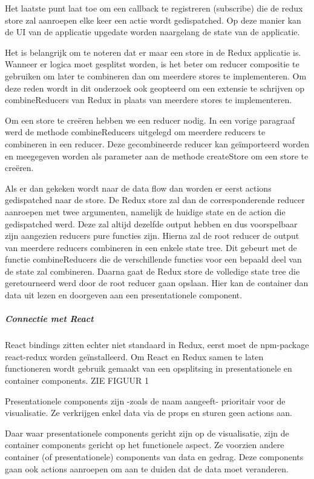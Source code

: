 Het laatste punt laat toe om een callback te registreren (subscribe) die de redux store zal aanroepen elke keer een actie wordt gedispatched. Op deze manier kan de UI van de applicatie upgedate worden naargelang de state van de applicatie. 

Het is belangrijk om te noteren dat er maar een store in de Redux applicatie is. Wanneer er logica moet gesplitst worden, is het beter om reducer compositie te gebruiken om later te combineren dan om meerdere stores te implementeren. Om deze reden wordt in dit onderzoek ook geopteerd om een extensie te schrijven op combineReducers van Redux in plaats van meerdere stores te implementeren.

Om een store te creëren hebben we een reducer nodig. In een vorige paragraaf werd de methode combineReducers uitgelegd om meerdere reducers te combineren in een reducer. Deze gecombineerde reducer kan geïmporteerd worden en meegegeven worden als parameter aan de methode createStore om een store te creëren.

Als er dan gekeken wordt naar de data flow dan worden er eerst actions gedispatched naar de store. De Redux store zal dan de corresponderende reducer aanroepen met twee argumenten, namelijk de huidige state en de action die gedispatched werd. Deze zal altijd dezelfde output hebben en dus voorspelbaar zijn aangezien reducers pure functies zijn.	 Hierna zal de root reducer de output van meerdere reducers combineren in een enkele state tree. Dit gebeurt met de functie combineReducers die de verschillende functies voor een bepaald deel van de state zal combineren. Daarna gaat de Redux store de volledige state tree die geretourneerd werd door de root reducer gaan opslaan. Hier kan de container dan data uit lezen en doorgeven aan een presentationele component.

\subparagraph{Connectie met React}
React bindings zitten echter niet standaard in Redux, eerst moet de npm-package react-redux worden geïnstalleerd. Om React en Redux samen te laten functioneren wordt gebruik gemaakt van een opsplitsing in presentationele en container components. 
ZIE FIGUUR 1

Presentationele components zijn -zoals de naam aangeeft- prioritair voor de visualisatie. Ze verkrijgen enkel data via de props en sturen geen actions aan. 

Daar waar presentationele components gericht zijn op de visualisatie, zijn de container components gericht op het functionele aspect. Ze voorzien andere container (of presentationele) components van data en gedrag. Deze components gaan ook actions aanroepen om aan te duiden dat de data moet veranderen.  


